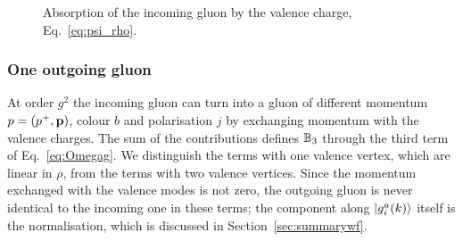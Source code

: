 \begin{figure}[t]
\centering
{}
\caption{Absorption of the incoming gluon by the valence charge, Eq.~\eqref{eq:psi_rho}.}
\label{fig:g_vac}
\end{figure}

\subsubsection{One outgoing gluon}\label{sec:oneout}

At order $g^2$ the incoming gluon can turn into a gluon of different momentum $p=(p^+,\mathbf{p})$, colour $b$ and polarisation $j$ by exchanging momentum with the valence charges. The sum of the contributions defines $\mathbb{B}_3$ through the third term of Eq.~\eqref{eq:Omegag}. We distinguish the terms with one valence vertex, which are linear in $\rho$, from the terms with two valence vertices. Since the momentum exchanged with the valence modes is not zero, the outgoing gluon is never identical to the incoming one in these terms; the component along $\ket{g^a_i(k)}$ itself is the normalisation, which is discussed in Section~\ref{sec:summarywf}.

